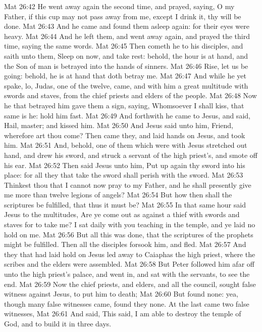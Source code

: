 \vs Mat 26:42 He went away again the second time, and prayed, saying, O my Father, if this cup may not pass away from me, except I drink it, thy will be done.
\vs Mat 26:43 And he came and found them asleep again: for their eyes were heavy.
\vs Mat 26:44 And he left them, and went away again, and prayed the third time, saying the same words.
\vs Mat 26:45 Then cometh he to his disciples, and saith unto them, Sleep on now, and take  rest: behold, the hour is at hand, and the Son of man is betrayed into the hands of sinners.
\vs Mat 26:46 Rise, let us be going: behold, he is at hand that doth betray me.
\vs Mat 26:47 And while he yet spake, lo, Judas, one of the twelve, came, and with him a great multitude with swords and staves, from the chief priests and elders of the people.
\vs Mat 26:48 Now he that betrayed him gave them a sign, saying, Whomsoever I shall kiss, that same is he: hold him fast.
\vs Mat 26:49 And forthwith he came to Jesus, and said, Hail, master; and kissed him.
\vs Mat 26:50 And Jesus said unto him, Friend, wherefore art thou come? Then came they, and laid hands on Jesus, and took him.
\vs Mat 26:51 And, behold, one of them which were with Jesus stretched out  hand, and drew his sword, and struck a servant of the high priest's, and smote off his ear.
\vs Mat 26:52 Then said Jesus unto him, Put up again thy sword into his place: for all they that take the sword shall perish with the sword.
\vs Mat 26:53 Thinkest thou that I cannot now pray to my Father, and he shall presently give me more than twelve legions of angels?
\vs Mat 26:54 But how then shall the scriptures be fulfilled, that thus it must be?
\vs Mat 26:55 In that same hour said Jesus to the multitudes, Are ye come out as against a thief with swords and staves for to take me? I sat daily with you teaching in the temple, and ye laid no hold on me.
\vs Mat 26:56 But all this was done, that the scriptures of the prophets might be fulfilled. Then all the disciples forsook him, and fled.
\vs Mat 26:57 And they that had laid hold on Jesus led  away to Caiaphas the high priest, where the scribes and the elders were assembled.
\vs Mat 26:58 But Peter followed him afar off unto the high priest's palace, and went in, and sat with the servants, to see the end.
\vs Mat 26:59 Now the chief priests, and elders, and all the council, sought false witness against Jesus, to put him to death;
\vs Mat 26:60 But found none: yea, though many false witnesses came,  found they none. At the last came two false witnesses,
\vs Mat 26:61 And said, This  said, I am able to destroy the temple of God, and to build it in three days.
